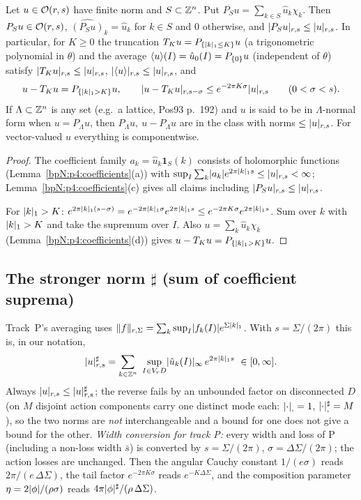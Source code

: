 \begin{lemma}[$P_S$, $T_K$, averages]\label{bpN:p4:projections}
Let $u\in\mathcal O(r,s)$ have finite norm and $S\subset\mathbb{Z}^n$. Put $P_Su=\sum_{k\in S}\hat u_k\chi_k$. Then $P_Su\in\mathcal O(r,s)$, $\widehat{(P_Su)}_k=\hat u_k$ for $k\in S$ and $0$ otherwise, and
$\lvert P_Su\rvert_{r,s}\le\lvert u\rvert_{r,s}$. In particular, for $K\ge0$ the truncation $T_Ku=P_{\{\lvert k\rvert_1\le K\}}u$ (a trigonometric polynomial in $\theta$) and the average $\langle u\rangle(I)=\hat u_0(I)=P_{\{0\}}u$ (independent of $\theta$) satisfy $\lvert T_Ku\rvert_{r,s}\le\lvert u\rvert_{r,s}$, $\lvert \langle u\rangle\rvert_{r,s}\le\lvert u\rvert_{r,s}$, and
\[u-T_Ku=P_{\{\lvert k\rvert_1>K\}}u,\qquad \lvert u-T_Ku\rvert_{r,s-\sigma}\le e^{-2\pi K\sigma}\lvert u\rvert_{r,s}\qquad(0<\sigma<s).\]
If $\Lambda\subset\mathbb{Z}^n$ is any set (e.g.\ a lattice, Pos93 p.~192) and $u$ is said to be in $\Lambda$-normal form when $u=P_\Lambda u$, then $P_\Lambda u,\ u-P_\Lambda u$ are in the class with norms $\le\lvert u\rvert_{r,s}$. For vector-valued $u$ everything is componentwise.
\end{lemma}
\begin{proof}
\label{stepN:p4:pr-class} The coefficient family $a_k=\hat u_k\mathbf 1_S(k)$ consists of holomorphic functions (Lemma~\ref{bpN:p4:coefficients}(a)) with $\sup_I\sum_k\lvert a_k\rvert e^{2\pi\lvert k\rvert_1s}\le\lvert u\rvert_{r,s}<\infty$; Lemma~\ref{bpN:p4:coefficients}(c) gives all claims including $\lvert P_Su\rvert_{r,s}\le\lvert u\rvert_{r,s}$.

\label{stepN:p4:pr-tail} For $\lvert k\rvert_1>K$: $e^{2\pi\lvert k\rvert_1(s-\sigma)}=e^{-2\pi\lvert k\rvert_1\sigma}e^{2\pi\lvert k\rvert_1s}\le e^{-2\pi K\sigma}e^{2\pi\lvert k\rvert_1s}$. Sum over $k$ with $\lvert k\rvert_1>K$ and take the supremum over $I$. Also $u=\sum_k\hat u_k\chi_k$ (Lemma~\ref{bpN:p4:coefficients}(d)) gives $u-T_Ku=P_{\{\lvert k\rvert_1>K\}}u$.
\end{proof}

\subsection{The stronger norm $\sharp$ (sum of coefficient suprema)}\label{bpN:p4:s-sharp}

Track~P's averaging uses $\lVert f\rVert_{r,\Sigma}=\sum_k\sup_I\lvert f_k(I)\rvert e^{\Sigma\lvert k\rvert_1}$. With $s=\Sigma/(2\pi)$ this is, in our notation,
\[\lvert u\rvert_{r,s}^\sharp=\sum_{k\in\mathbb{Z}^n}\ \sup_{I\in V_rD}\lvert \hat u_k(I)\rvert_\infty\,e^{2\pi\lvert k\rvert_1s}\ \in[0,\infty].\]
Always $\lvert u\rvert_{r,s}\le\lvert u\rvert_{r,s}^\sharp$; the reverse fails by an unbounded factor on disconnected $D$ (on $M$ disjoint action components carry one distinct mode each: $\lvert \cdot\rvert_{,}=1$, $\lvert \cdot\rvert_{,}^\sharp=M$), so the two norms are \emph{not} interchangeable and a bound for one does not give a bound for the other.
\emph{Width conversion for track P:} every width and loss of P (including a non-loss width $\bar s$) is converted by $s=\Sigma/(2\pi)$, $\sigma=\Delta\Sigma/(2\pi)$; the action losses are unchanged. Then the angular Cauchy constant $1/(e\sigma)$ reads $2\pi/(e\,\Delta\Sigma)$, the tail factor $e^{-2\pi K\sigma}$ reads $e^{-K\Delta\Sigma}$, and the composition parameter $\eta=2\lvert \phi\rvert/(\rho\sigma)$ reads $4\pi\lvert \phi\rvert^\sharp/(\rho\,\Delta\Sigma)$.

